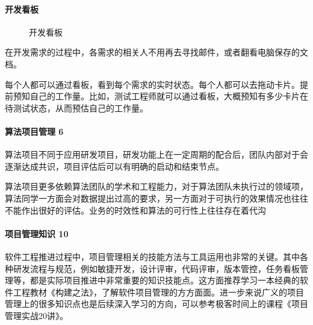 \documentclass[letterpaper,10pt,english]{sphinxmanual}
\begin{document}
\paragraph{开发看板}
\label{\detokenize{chapter_knowledge/project_manage:id10}}
\begin{figure}[H]
\centering
\capstart

\noindent{}
\caption{开发看板\sphinxfootnotemark[654]}\label{\detokenize{chapter_knowledge/project_manage:id22}}\end{figure}
%
\begin{footnotetext}[654]\sphinxAtStartFootnote
{}
%
\end{footnotetext}\ignorespaces 
在开发需求的过程中，各需求的相关人不用再去寻找邮件，或者翻看电脑保存的文档。

每个人都可以通过看板，看到每个需求的实时状态。每个人都可以去拖动卡片。提前预知自己的工作量。比如，测试工程师就可以通过看板，大概预知有多少卡片在待测试状态，从而预估自己的工作量。


\paragraph{算法项目管理 6\sphinxfootnotemark[655]}
\label{\detokenize{chapter_knowledge/project_manage:id11}}%
\begin{footnotetext}[655]\sphinxAtStartFootnote
{}
%
\end{footnotetext}\ignorespaces 
算法项目不同于应用研发项目，研发功能上在一定周期的配合后，团队内部对于会逐渐达成共识，项目评估后可以有明确的启动和结束节点。

算法项目更多依赖算法团队的学术和工程能力，对于算法团队未执行过的领域项，算法同学一方面会对数据提出过高的要求，另一方面对于可执行的效果情况也往往不能作出很好的评估。业务的时效性和算法的可行性上往往存在着代沟


\paragraph{项目管理知识 10\sphinxfootnotemark[656]}
\label{\detokenize{chapter_knowledge/project_manage:id12}}%
\begin{footnotetext}[656]\sphinxAtStartFootnote
{}
%
\end{footnotetext}\ignorespaces 
软件工程推进过程中，项目管理相关的技能方法与工具运用也非常的关键。其中各种研发流程与规范，例如敏捷开发，设计评审，代码评审，版本管控，任务看板管理等，都是实际项目推进中非常重要的知识技能点。这方面推荐学习一本经典的软件工程教材《构建之法》，了解软件项目管理的方方面面。进一步来说广义的项目管理上的很多知识点也是后续深入学习的方向，可以参考极客时间上的课程《项目管理实战20讲》。
\end{document}
